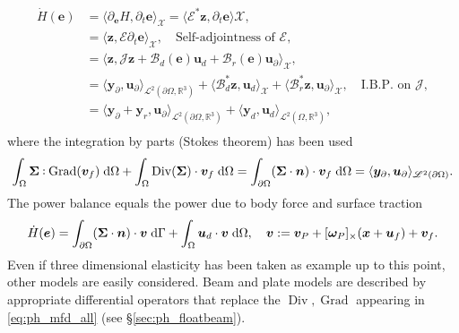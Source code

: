 \documentclass{svjour3}                     %
\newcommand{\secref}[1]{\S\ref{#1}}
\DeclareMathOperator*{\Grad}{Grad}
\DeclareMathOperator*{\Div}{Div}
\newcommand{\crmat}[1]{\ensuremath{[#1]_{\times}}}
\def\onedot{$\mathsurround0pt\ldotp$}
\def\cddot{%
	\mathbin{\vcenter{\baselineskip.67ex
			\hbox{\onedot}\hbox{\onedot}}%
}}
\begin{document}
\begin{equation}
\begin{aligned}
\dot{H}(\bm{e}) &= \langle \partial_{\bm{e}} H, \partial_t {\bm{e}} \rangle_{\mathscr{X}} = \langle \bm{\mathcal{E}}^* \bm{z}, \partial_t {\bm{e}} \rangle{\mathscr{X}}, \\
&= \langle \bm{z}, \bm{\mathcal{E}} \partial_t {\bm{e}} \rangle_{\mathscr{X}}, \quad \text{Self-adjointness of } \bm{\mathcal{E}}, \\
& = \langle \bm{z}, \bm{\mathcal{J}}\bm{z} + \bm{\mathcal{B}}_d(\bm{e}) \bm{u}_d + \bm{\mathcal{B}}_r(\bm{e}) \bm{u}_\partial \rangle_{\mathscr{X}}, \\
& = \langle \bm{y}_\partial,  \bm{u}_\partial \rangle_{\mathscr{L}^2(\partial\Omega, \mathbb{R}^3)} + \langle \bm{\mathcal{B}}_d^* \bm{z}, \bm{u}_d \rangle_{\mathscr{X}} + \langle \bm{\mathcal{B}}_r^* \bm{z}, \bm{u}_\partial \rangle_{\mathscr{X}}, \quad \text{I.B.P. on } \bm{\mathcal{J}}, \\
 &= \langle \bm{y}_\partial + \bm{y}_r,  \bm{u}_\partial \rangle_{\mathscr{L}^2(\partial\Omega, \mathbb{R}^3)} + \langle \bm{y}_d,  \bm{u}_d \rangle_{\mathscr{L}^2(\Omega, \mathbb{R}^3)}, \\
\end{aligned}
\end{equation}
where the integration by parts (Stokes theorem) has been used
\begin{equation}
\label{eq:stokes}
\int_{\Omega} \bm\Sigma \cddot \Grad(\bm{v}_f) \d{\Omega} + \int_{\Omega} \Div(\bm\Sigma) \cdot \bm{v}_f \d{\Omega} = \int_{\partial \Omega} (\bm\Sigma \cdot \bm{n}) \cdot \bm{v}_f \d{\Omega} = \langle \bm{y}_\partial,  \bm{u}_\partial \rangle_{\mathscr{L}^2(\partial\Omega)}.
\end{equation}
The power balance equals the power due to body force and surface traction
\begin{equation}
	\dot{H}(\bm{e}) = \int_{\partial \Omega} (\bm{\Sigma} \cdot \bm{n}) \cdot \bm{v} \d\Gamma + \int_{\Omega} \bm{u}_d \cdot \bm{v}  \d{\Omega}, \quad \bm{v} := \bm{v}_P + \crmat{\bm{\omega}_P} (\bm{x}+\bm{u}_f) + {\bm{v}}_f.
\end{equation}
Even if three dimensional elasticity has been taken as example up to this point, other models are easily considered. Beam and plate models \cite{BRUGNOLI2019940,BRUGNOLI2019961} are described by appropriate differential operators that replace the $\Div, \Grad$ appearing in \eqref{eq:ph_mfd_all} (see \secref{sec:ph_floatbeam}).
\end{document}
